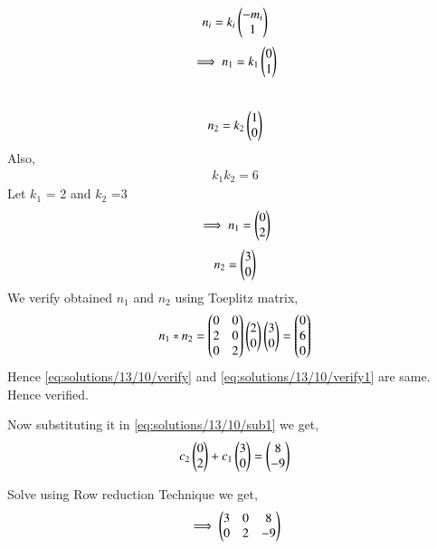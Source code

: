 \begin{align}
n_i = k_i\begin{pmatrix}-m_i\\1\end{pmatrix}
\end{align}
\begin{align}
\implies n_1 = k_1\begin{pmatrix}0\\1\end{pmatrix}
\end{align}\\
\begin{align}
n_2 = k_2\begin{pmatrix}1\\0\end{pmatrix}
\end{align}
Also,
\begin{align}
k_1k_2 = 6
\end{align}
Let $k_1$ = 2 and $k_2$ =3
\begin{align}
\implies n_1 = \begin{pmatrix}0\\2\end{pmatrix}
\label{eq:solutions/13/10/n1}
\end{align}
\begin{align}
n_2 = \begin{pmatrix}3\\0\end{pmatrix}
\label{eq:solutions/13/10/n2}
\end{align}
We verify obtained $n_1$ and $n_2$ using Toeplitz matrix,
\begin{align}
n_1*n_2 = \begin{pmatrix}0&0\\2 &0\\0&2\end{pmatrix}\begin{pmatrix}2\\0\end{pmatrix}\begin{pmatrix}3\\0\end{pmatrix} = \begin{pmatrix}0\\6\\0\end{pmatrix}
\label{eq:solutions/13/10/verify1}
\end{align}
Hence \eqref{eq:solutions/13/10/verify} and \eqref{eq:solutions/13/10/verify1} are same. Hence verified. 

Now substituting it in \eqref{eq:solutions/13/10/sub1} we get,
\begin{align}
c_2\begin{pmatrix}0\\2\end{pmatrix}+c_1\begin{pmatrix}3\\0\end{pmatrix} = \begin{pmatrix}8\\-9\end{pmatrix}
\end{align}

Solve using Row reduction Technique we get,
\begin{align}
\implies\begin{pmatrix}3&0&8\\0&2&-9\end{pmatrix} 
\end{align}

